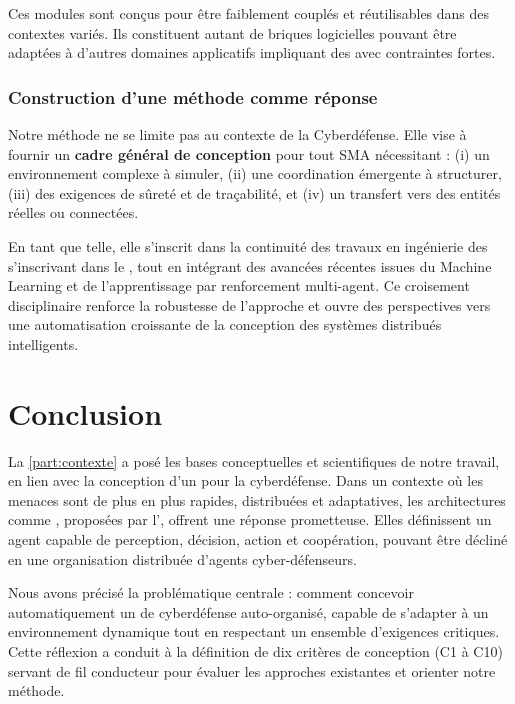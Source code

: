 Ces modules sont conçus pour être faiblement couplés et réutilisables dans des contextes variés. Ils constituent autant de briques logicielles pouvant être adaptées à d'autres domaines applicatifs impliquant des  avec contraintes fortes.



\subsection{Construction d'une méthode comme réponse}

Notre méthode ne se limite pas au contexte de la Cyberdéfense. Elle vise à fournir un \textbf{cadre général de conception} pour tout SMA nécessitant : (i) un environnement complexe à simuler, (ii) une coordination émergente à structurer, (iii) des exigences de sûreté et de traçabilité, et (iv) un transfert vers des entités réelles ou connectées.

En tant que telle, elle s'inscrit dans la continuité des travaux en ingénierie des  s'inscrivant dans le , tout en intégrant des avancées récentes issues du Machine Learning et de l'apprentissage par renforcement multi-agent. Ce croisement disciplinaire renforce la robustesse de l'approche et ouvre des perspectives vers une automatisation croissante de la conception des systèmes distribués intelligents.


\chapter*{Conclusion}

La \autoref{part:contexte} a posé les bases conceptuelles et scientifiques de notre travail, en lien avec la conception d'un  pour la cyberdéfense. Dans un contexte où les menaces sont de plus en plus rapides, distribuées et adaptatives, les architectures comme , proposées par l', offrent une réponse prometteuse. Elles définissent un agent capable de perception, décision, action et coopération, pouvant être décliné en une organisation distribuée d'agents cyber-défenseurs.

Nous avons précisé la problématique centrale : comment concevoir automatiquement un  de cyberdéfense auto-organisé, capable de s'adapter à un environnement dynamique tout en respectant un ensemble d'exigences critiques. Cette réflexion a conduit à la définition de dix critères de conception (C1 à C10) servant de fil conducteur pour évaluer les approches existantes et orienter notre méthode.

